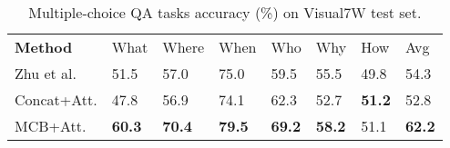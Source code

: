 \documentclass[11pt,letterpaper]{article}
\begin{document}
\begin{table}[t]
\centering
\small
\begin{tabular}{@{}ll@{\ }l@{\ }l@{\ }l@{\ }l@{\ }l@{\ }l@{}}
\toprule
 \bf Method &  What &  Where &  When &  Who &  Why &  How & Avg \\ \cmidrule(lr){1-1}\cmidrule(lr){2-7}\cmidrule(lr){8-8}
Zhu et al. & 51.5 & 57.0 & 75.0 & 59.5 & 55.5 & 49.8 & 54.3 \\
 Concat+Att. & 47.8 & 56.9 & 74.1 & 62.3 & 52.7 & \bf 51.2 & 52.8 \\
 MCB+Att. & \bf 60.3 & \bf 70.4 & \bf 79.5 & \bf 69.2 & \bf 58.2 & 51.1 & \bf 62.2 \\
 \bottomrule
\end{tabular}
\caption{Multiple-choice QA tasks accuracy (\%) on Visual7W test set.}
\label{tab:Visual7W}
\end{table}
\end{document}
